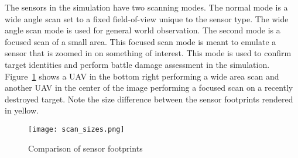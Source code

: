 
The sensors in the simulation have two scanning modes.  The normal mode is a wide angle scan set to a fixed field-of-view unique to the sensor type.  The wide angle scan mode is used for general world observation.  The second mode is a focused scan of a small area.  This focused scan mode is meant to emulate a sensor that is zoomed in on something of interest.  This mode is used to confirm target identities and perform battle damage assessment in the simulation.  Figure~\ref{fig:scan_sizes} shows a UAV in the bottom right performing a wide area scan and another UAV in the center of the image performing a focused scan on a recently destroyed target.  Note the size difference between the sensor footprints rendered in yellow.


\begin{figure}[H]
	\centering
	\texttt{[image: scan\_sizes.png]}
	\caption{Comparison of sensor footprints}
	\label{fig:scan_sizes}
\end{figure}



